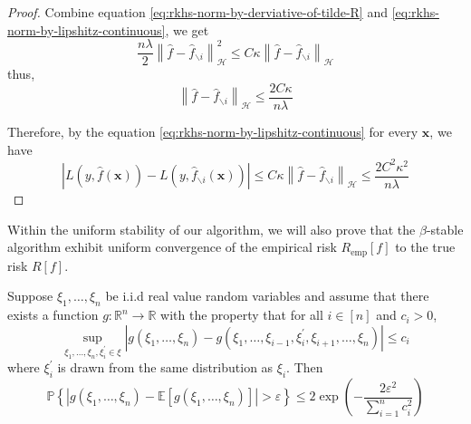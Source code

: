 \begin{proof}
	Combine equation \eqref{eq:rkhs-norm-by-derviative-of-tilde-R} and \eqref{eq:rkhs-norm-by-lipshitz-continuous}, we get
	\begin{equation}
		\frac{n\lambda}{2}\left\|\hat{f}-\hat{f}_{\backslash i}\right\|_{\mathcal{H}}^{2}\leq C\kappa\left\|\hat{f}-\hat{f}_{\backslash i}\right\|_{\mathcal{H}}
	\end{equation}
	thus,
	\begin{equation}
		\left\|\hat{f}-\hat{f}_{\backslash i}\right\|_{\mathcal{H}}\leq\frac{2C\kappa}{n\lambda}
	\end{equation}

	Therefore, by the equation \eqref{eq:rkhs-norm-by-lipshitz-continuous} for every $\mathbf{x}$, we have
	\begin{equation}
		\left|L\left(y,\hat{f}(\mathbf{x})\right)-L\left(y,\hat{f}_{\backslash i}(\mathbf{x})\right)\right|\leq C\kappa\left\|\hat{f}-\hat{f}_{\backslash i}\right\|_{\mathcal{H}}\leq\frac{2C^{2}\kappa^{2}}{n\lambda}
	\end{equation}
\end{proof}

Within the uniform stability of our algorithm, we will also prove that the $\beta$-stable algorithm exhibit uniform convergence of the empirical risk $R_{\text{emp}}[f]$ to the true risk $R[f]$.

\begin{theorem} \label{thm:McDiarmid-bound}
	Suppose $\xi_{1},\ldots,\xi_{n}$ be i.i.d real value random variables and assume that there exists a function $g:\mathbb{R}^{n}\rightarrow\mathbb{R}$ with the property that for all $i\in[n]$ and $c_{i}>0$,
	\begin{equation}
		\sup_{\xi_{1},\ldots,\xi_{n},\xi_{i}^{\prime}\in\xi}\left|g\left(\xi_{1},\ldots,\xi_{n}\right)-g\left(\xi_{1},\ldots,\xi_{i-1},\xi_{i}^{\prime},\xi_{i+1},\ldots,\xi_{n}\right)\right|\leq c_{i}
	\end{equation}
	where $\xi_{i}^{\prime}$ is drawn from the same distribution as $\xi_{i}$. Then
	\begin{equation}
		\mathbb{P}\left\{\left|g\left(\xi_{1},\ldots,\xi_{n}\right)-\mathbb{E}\left[g\left(\xi_{1},\ldots,\xi_{n}\right)\right]\right|>\varepsilon\right\}\leq 2\exp\left(-\frac{2\varepsilon^{2}}{\sum_{i=1}^{n}c_{i}^{2}}\right)
	\end{equation}
\end{theorem}

